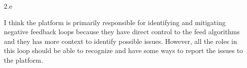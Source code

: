 \LARGE
2.e
\normalsize

\begin{answer}
  I think the platform is primarily responsible for identifying and
  mitigating negative feedback loops because they have direct control
  to the feed algorithms and they has more context to identify possible
  issues. However, all the roles in this loop should be able to recognize
  and have some ways to report the issues to the platform.
\end{answer}
\clearpage



